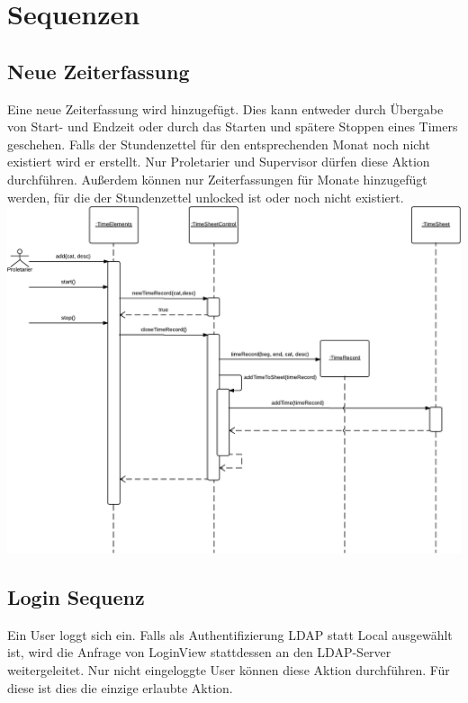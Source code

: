 \section{Sequenzen}
    \subsection{Neue Zeiterfassung}
        Eine neue Zeiterfassung wird hinzugefügt.
        Dies kann entweder durch Übergabe von Start- und Endzeit oder durch das Starten und spätere Stoppen eines Timers geschehen.
        Falls der Stundenzettel für den entsprechenden Monat noch nicht existiert wird er erstellt.
        Nur Proletarier und Supervisor dürfen diese Aktion durchführen.
        Außerdem können nur Zeiterfassungen für Monate hinzugefügt werden, für die der Stundenzettel unlocked ist oder noch nicht existiert.\\

        \includegraphics[width=\linewidth]{Diagramms/sequenzes/new_Time_record.pdf}

    \newpage
    \subsection{Login Sequenz}
        Ein User loggt sich ein.
        Falls als Authentifizierung LDAP statt Local ausgewählt ist, wird die Anfrage von LoginView stattdessen an den LDAP-Server weitergeleitet.
        Nur nicht eingeloggte User können diese Aktion durchführen.
        Für diese ist dies die einzige erlaubte Aktion.\\

